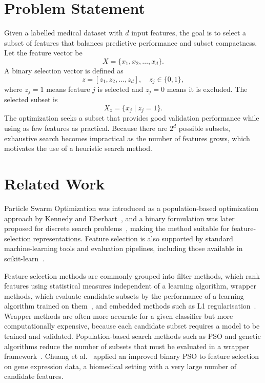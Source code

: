 \documentclass[conference]{IEEEtran}
\begin{document}
\section{Problem Statement}

Given a labelled medical dataset with $d$ input features, the goal is to
select a subset of features that balances predictive performance and subset
compactness. Let the feature vector be
\begin{equation}
X = \{x_1, x_2, \ldots, x_d\}.
\end{equation}
A binary selection vector is defined as
\begin{equation}
z = [z_1, z_2, \ldots, z_d], \quad z_j \in \{0,1\},
\end{equation}
where $z_j = 1$ means feature $j$ is selected and $z_j = 0$ means it is
excluded. The selected subset is
\begin{equation}
X_z = \{x_j \mid z_j = 1\}.
\end{equation}
The optimization seeks a subset that provides good validation performance
while using as few features as practical. Because there are $2^d$ possible
subsets, exhaustive search becomes impractical as the number of features
grows, which motivates the use of a heuristic search method.

\section{Related Work}

Particle Swarm Optimization was introduced as a population-based optimization
approach by Kennedy and Eberhart~\cite{kennedy1995}, and a binary formulation
was later proposed for discrete search problems~\cite{kennedy1997}, making the
method suitable for feature-selection representations. Feature selection is
also supported by standard machine-learning tools and evaluation pipelines,
including those available in scikit-learn~\cite{pedregosa2011}.

Feature selection methods are commonly grouped into filter methods, which rank
features using statistical measures independent of a learning algorithm,
wrapper methods, which evaluate candidate subsets by the performance of a
learning algorithm trained on them~\cite{guyon2003,kohavi1997}, and embedded
methods such as L1 regularisation~\cite{tibshirani1996}. Wrapper methods are
often more accurate for a given classifier but more computationally expensive,
because each candidate subset requires a model to be trained and validated.
Population-based search methods such as PSO and genetic algorithms reduce the
number of subsets that must be evaluated in a wrapper
framework~\cite{xue2016}. Chuang et al.~\cite{chuang2008} applied an improved
binary PSO to feature selection on gene expression data, a biomedical setting
with a very large number of candidate features.
\end{document}
